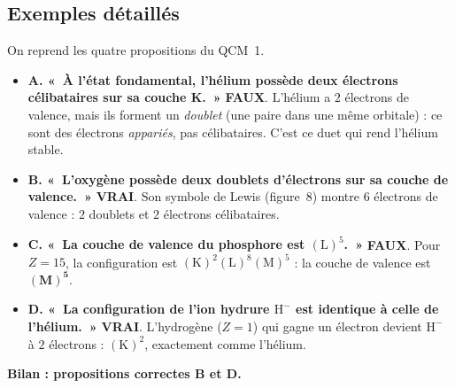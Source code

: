 \documentclass[11pt,a4paper]{article}
\begin{document}
\subsection{Exemples détaillés}

\begin{exemple}
On reprend les quatre propositions du QCM~1.
\begin{itemize}[leftmargin=1.5em,topsep=3pt,itemsep=4pt]
  \item \textbf{A. «~À l'état fondamental, l'hélium possède deux électrons célibataires sur sa couche
        K.~»} \;\textbf{\textcolor{attncol}{FAUX}}. L'hélium a $2$ électrons de valence, mais ils
        forment un \emph{doublet} (une paire dans une même orbitale) : ce sont des électrons
        \emph{appariés}, pas célibataires. C'est ce duet qui rend l'hélium stable.
  \item \textbf{B. «~L'oxygène possède deux doublets d'électrons sur sa couche de valence.~»}
        \;\textbf{\textcolor{excol}{VRAI}}. Son symbole de Lewis (figure~8) montre $6$ électrons de
        valence : $2$ doublets et $2$ électrons célibataires.
  \item \textbf{C. «~La couche de valence du phosphore est $(\mathrm{L})^5$.~»}
        \;\textbf{\textcolor{attncol}{FAUX}}. Pour $Z = 15$, la configuration est
        $(\mathrm{K})^2(\mathrm{L})^8(\mathrm{M})^5$ : la couche de valence est $\mathbf{(M)^5}$.
  \item \textbf{D. «~La configuration de l'ion hydrure $\mathrm{H}^{-}$ est identique à celle de
        l'hélium.~»} \;\textbf{\textcolor{excol}{VRAI}}. L'hydrogène ($Z=1$) qui gagne un électron
        devient $\mathrm{H}^{-}$ à $2$ électrons : $(\mathrm{K})^2$, exactement comme l'hélium.
\end{itemize}
\textbf{Bilan : propositions correctes B et D.}
\end{exemple}
\end{document}
